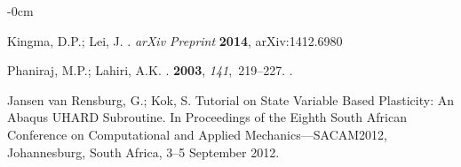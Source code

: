 \documentclass[algorithms,article,accept,pdftex,moreauthors]{Definitions/mdpi}
\begin{document}
\begin{adjustwidth}{-\extralength}{0cm}
\begin{thebibliography}{999}
Kingma, D.P.; Lei, J.
. \emph{arXiv Preprint} \textbf{2014}, arXiv:1412.6980


Phaniraj, M.P.; Lahiri, A.K.
.
 {\bf 2003}, {\em
  141},~219--227.
.

{Jansen van Rensburg}, G.; Kok, S.
\newblock Tutorial on State Variable Based Plasticity: {{An Abaqus UHARD}}
  Subroutine.
\newblock In Proceedings of the Eighth {{South African Conference}} on
  {{Computational}} and {{Applied Mechanics}}---{{SACAM2012}}, Johannesburg, South Africa, 3--5 September 2012.

\end{thebibliography}


%




\PublishersNote{}
\end{adjustwidth}
\end{document}
